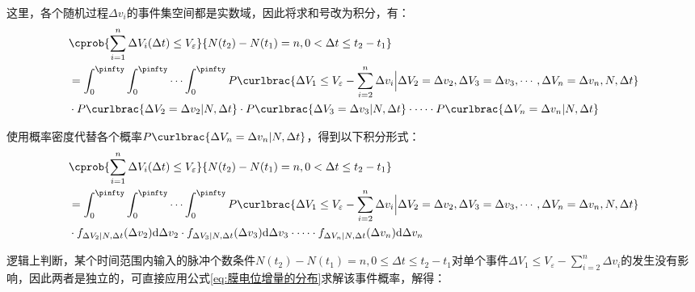 \documentclass[11pt]{article}
\begin{document}
这里，各个随机过程$\Delta v_i$的事件集空间都是实数域，因此将求和号改为积分，有：
\begin{align}
  \begin{aligned}
     & \cprob{\sum_{i=1}^{n}\Delta V_i(\Delta t)\le V_\varepsilon}{N(t_2)-N(t_1)=n,0<\Delta t\le t_2-t_1}                                                                                                                    \\
     & =\int_{0}^{\pinfty}\int_{0}^{\pinfty}\cdots\int_{0}^{\pinfty}P\curlbrac{\Delta V_1\le V_\varepsilon-\sum_{i=2}^{n}\Delta v_i\Big|\Delta V_2=\Delta v_2,\Delta V_3=\Delta v_3,\cdots,\Delta V_n=\Delta v_n,N,\Delta t} \\
     & \cdot P\curlbrac{\Delta V_2=\Delta v_2|N,\Delta t}\cdot P\curlbrac{\Delta V_3=\Delta v_3|N,\Delta t}\cdot \cdots \cdot P\curlbrac{\Delta V_n=\Delta v_n|N,\Delta t}
  \end{aligned}
\end{align}\par
使用概率密度代替各个概率$P\curlbrac{\Delta V_n=\Delta v_n|N,\Delta t}$，得到以下积分形式：
\begin{align}
  \begin{aligned}
     & \cprob{\sum_{i=1}^{n}\Delta V_i(\Delta t)\le V_\varepsilon}{N(t_2)-N(t_1)=n,0<\Delta t\le t_2-t_1}                                                                                                                    \\
     & =\int_{0}^{\pinfty}\int_{0}^{\pinfty}\cdots\int_{0}^{\pinfty}P\curlbrac{\Delta V_1\le V_\varepsilon-\sum_{i=2}^{n}\Delta v_i\Big|\Delta V_2=\Delta v_2,\Delta V_3=\Delta v_3,\cdots,\Delta V_n=\Delta v_n,N,\Delta t} \\
     & \cdot f_{\Delta V_2|N,\Delta t}(\Delta v_2)\mathrm{d}\Delta v_2\cdot f_{\Delta V_3|N,\Delta t}(\Delta v_3)\mathrm{d}\Delta v_3\cdot \cdots \cdot f_{\Delta V_n|N,\Delta t}(\Delta v_n)\mathrm{d}\Delta v_n
  \end{aligned}
\end{align}\par
逻辑上判断，某个时间范围内输入的脉冲个数条件$N(t_2)-N(t_1)=n,0\le \Delta t\le t_2-t_1$对单个事件$\Delta V_1\le V_\varepsilon-\sum_{i=2}^{n}\Delta v_i$的发生没有影响，因此两者是独立的，可直接应用公式\ref{eq:膜电位增量的分布}求解该事件概率，解得：
\end{document}
